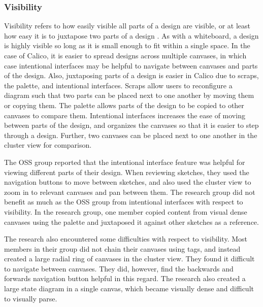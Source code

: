 
\subsubsection{Visibility}

Visibility refers to how easily visible all parts of a design are visible, or at least how easy it is to juxtapose two parts of a design \cite{Petre2013BookChapter}. As with a whiteboard, a design is highly visible so long as it is small enough to fit within a single space. In the case of Calico, it is easier to spread designs across multiple canvases, in which case intentional interfaces may be helpful to navigate between canvases and parts of the design. Also, juxtaposing parts of a design is easier in Calico due to scraps, the palette, and intentional interfaces. Scraps allow users to reconfigure a diagram such that two parts can be placed next to one another by moving them or copying them. The palette allows parts of the design to be copied to other canvases to compare them. Intentional interfaces increases the ease of moving between parts of the design, and organizes the canvases so that it is easier to step through a design. Further, two canvases can be placed next to one another in the cluster view for comparison.

The OSS group reported that the intentional interface feature was helpful for viewing different parts of their design. When reviewing sketches, they used the navigation buttons to move between sketches, and also used the cluster view to zoom in to relevant canvases and pan between them. The research group did not benefit as much as the OSS group from intentional interfaces with respect to visibility. In the research group, one member copied content from visual dense canvases using the palette and juxtaposed it against other sketches as a reference.

The research also encountered some difficulties with respect to visibility. Most members in their group did not chain their canvases using tags, and instead created a large radial ring of canvases in the cluster view. They found it difficult to navigate between canvases. They did, however, find the backwards and forwards navigation button helpful in this regard. The research also created a large state diagram in a single canvas, which became visually dense and difficult to visually parse. 

